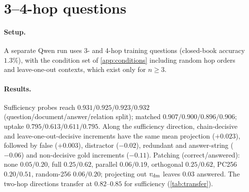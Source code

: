 \section{3--4-hop questions}
\label{app:multihop}
\paragraph{Setup.} A separate Qwen run uses 3- and 4-hop \musique{} training questions (closed-book accuracy $1.3\%$), with the condition set of \cref{app:conditions} including random hop orders and leave-one-out contexts, which exist only for $n\ge3$.

\paragraph{Results.} Sufficiency probes reach $0.931/0.925/0.923/0.932$ (question/document/answer/relation split); matched $0.907/0.900/0.896/0.906$; uptake $0.795/0.613/0.611/0.795$. Along the sufficiency direction, chain-decisive and leave-one-out-decisive increments have the same mean projection ($+0.023$), followed by false ($+0.003$), distractor ($-0.02$), redundant and answer-string ($-0.06$) and non-decisive gold increments ($-0.11$). Patching (correct/answered): none $0.05/0.20$, full $0.25/0.62$, parallel $0.06/0.19$, orthogonal $0.25/0.62$, PC256 $0.20/0.51$, random-256 $0.06/0.20$; projecting out $v_{\mathrm{dm}}$ leaves $0.03$ answered. The two-hop directions transfer at $0.82$--$0.85$ for sufficiency (\cref{tab:transfer}).
